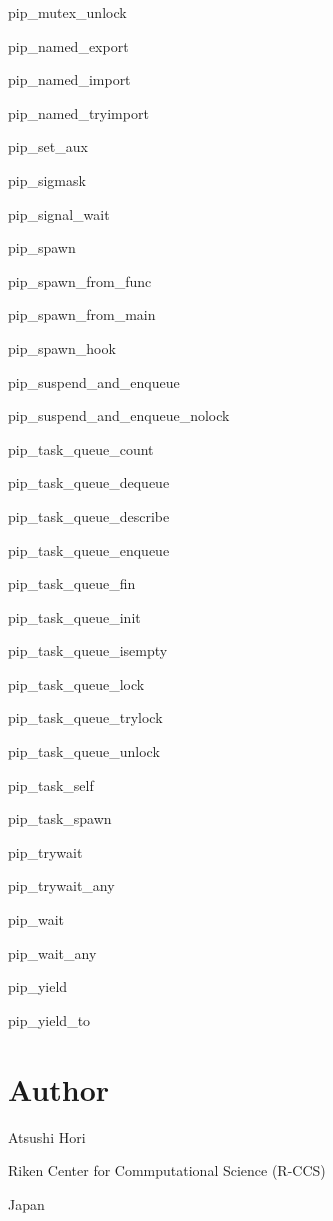 \begin{DoxyItemize}
\item pip\-\_\-mutex\-\_\-unlock
\item pip\-\_\-named\-\_\-export
\item pip\-\_\-named\-\_\-import
\item pip\-\_\-named\-\_\-tryimport
\item pip\-\_\-set\-\_\-aux
\item pip\-\_\-sigmask
\item pip\-\_\-signal\-\_\-wait
\item pip\-\_\-spawn
\item pip\-\_\-spawn\-\_\-from\-\_\-func
\item pip\-\_\-spawn\-\_\-from\-\_\-main
\item pip\-\_\-spawn\-\_\-hook
\item pip\-\_\-suspend\-\_\-and\-\_\-enqueue
\item pip\-\_\-suspend\-\_\-and\-\_\-enqueue\-\_\-nolock
\item pip\-\_\-task\-\_\-queue\-\_\-count
\item pip\-\_\-task\-\_\-queue\-\_\-dequeue
\item pip\-\_\-task\-\_\-queue\-\_\-describe
\item pip\-\_\-task\-\_\-queue\-\_\-enqueue
\item pip\-\_\-task\-\_\-queue\-\_\-fin
\item pip\-\_\-task\-\_\-queue\-\_\-init
\item pip\-\_\-task\-\_\-queue\-\_\-isempty
\item pip\-\_\-task\-\_\-queue\-\_\-lock
\item pip\-\_\-task\-\_\-queue\-\_\-trylock
\item pip\-\_\-task\-\_\-queue\-\_\-unlock
\item pip\-\_\-task\-\_\-self
\item pip\-\_\-task\-\_\-spawn
\item pip\-\_\-trywait
\item pip\-\_\-trywait\-\_\-any
\item pip\-\_\-wait
\item pip\-\_\-wait\-\_\-any
\item pip\-\_\-yield
\item pip\-\_\-yield\-\_\-to
\end{DoxyItemize}

\section*{Author}

Atsushi Hori

Riken Center for Commputational Science (R-\/\-C\-C\-S)

Japan 